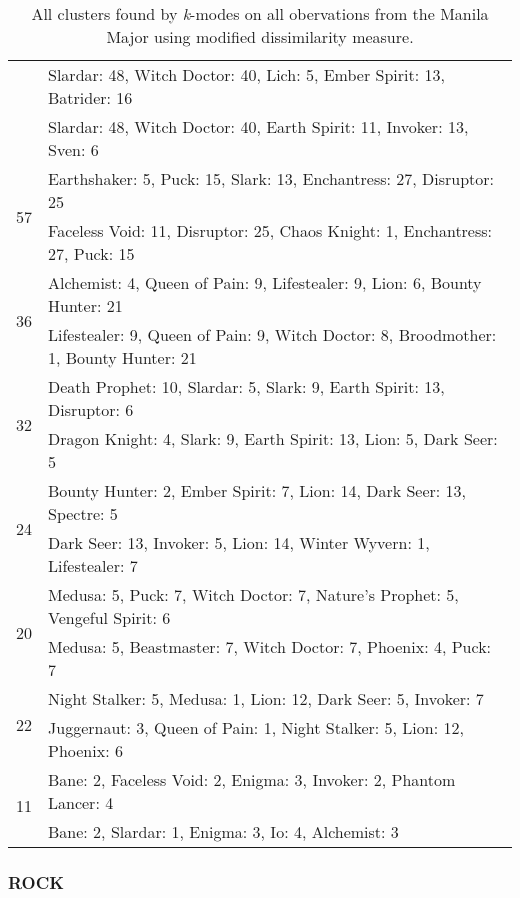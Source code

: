 \documentclass[result.tex]{subfiles}
\begin{document}
\begin{table}[H]
\begin{tabular}{ | c | p{12.5cm} | }
    & Slardar: 48, Witch Doctor: 40, Lich: 5, Ember Spirit: 13, Batrider: 16 \\
    & Slardar: 48, Witch Doctor: 40, Earth Spirit: 11, Invoker: 13, Sven: 6 \\
    \hline
    \multirow{2}{*}{57}
    & Earthshaker: 5, Puck: 15, Slark: 13, Enchantress: 27, Disruptor: 25 \\
    & Faceless Void: 11, Disruptor: 25, Chaos Knight: 1, Enchantress: 27, Puck: 15 \\
    \hline
    \multirow{2}{*}{36}
    & Alchemist: 4, Queen of Pain: 9, Lifestealer: 9, Lion: 6, Bounty Hunter: 21 \\
    & Lifestealer: 9, Queen of Pain: 9, Witch Doctor: 8, Broodmother: 1, Bounty Hunter: 21 \\
    \hline
    \multirow{2}{*}{32}
    & Death Prophet: 10, Slardar: 5, Slark: 9, Earth Spirit: 13, Disruptor: 6 \\
    & Dragon Knight: 4, Slark: 9, Earth Spirit: 13, Lion: 5, Dark Seer: 5 \\
    \hline
    \multirow{2}{*}{24}
    & Bounty Hunter: 2, Ember Spirit: 7, Lion: 14, Dark Seer: 13, Spectre: 5 \\
    & Dark Seer: 13, Invoker: 5, Lion: 14, Winter Wyvern: 1, Lifestealer: 7 \\
    \hline
    \multirow{2}{*}{20}
    & Medusa: 5, Puck: 7, Witch Doctor: 7, Nature's Prophet: 5, Vengeful Spirit: 6 \\
    & Medusa: 5, Beastmaster: 7, Witch Doctor: 7, Phoenix: 4, Puck: 7 \\
    \hline
    \multirow{2}{*}{22}
    & Night Stalker: 5, Medusa: 1, Lion: 12, Dark Seer: 5, Invoker: 7 \\
    & Juggernaut: 3, Queen of Pain: 1, Night Stalker: 5, Lion: 12, Phoenix: 6 \\
    \hline
    \multirow{2}{*}{11}
    & Bane: 2, Faceless Void: 2, Enigma: 3, Invoker: 2, Phantom Lancer: 4 \\
    & Bane: 2, Slardar: 1, Enigma: 3, Io: 4, Alchemist: 3 \\
    \hline
  \end{tabular}
   \caption{All clusters found by \textit{k}-modes on all obervations from the Manila Major using modified dissimilarity measure.}
  \label{tab:cl_app_manila_kmodes_mod}
\end{table}

\newpage

\subsubsection*{ROCK}
\end{document}

